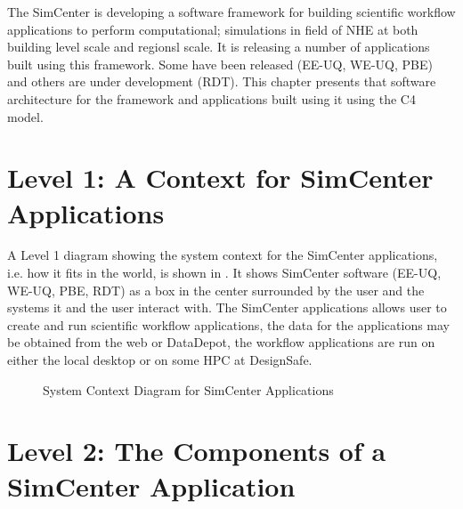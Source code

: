 

The SimCenter is developing a software framework for building scientific workflow applications to perform computational; simulations in field of NHE at both building level scale and regionsl scale. It is releasing a number of applications built using this framework. Some have been released (EE-UQ, WE-UQ, PBE) and others are under development (RDT). This chapter presents that software architecture for the framework and applications built using it using the C4 model.

\section{Level 1: A Context for SimCenter Applications}

A Level 1 diagram showing the system context for the SimCenter applications, i.e. how it fits in the world,  is shown in . It shows SimCenter software (EE-UQ, WE-UQ, PBE, RDT) as a box in the center surrounded by the user and the systems it and the user interact with. The SimCenter applications allows user to create and run scientific workflow applications, the data for the applications may be obtained from the web or DataDepot, the workflow applications are run on either the local desktop or on some HPC at DesignSafe. 

 \begin{figure}[!htbp]
  \caption{System Context Diagram for SimCenter Applications}
  \label{fig:context}
\end{figure}


\section{Level 2:  The Components of a SimCenter Application}

